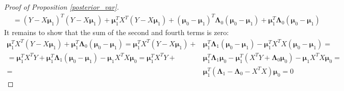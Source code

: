 \documentclass[10pt,fleqn]{amsart}
\theoremstyle{definition}
\theoremstyle{remark}
\numberwithin{equation}{section}
\newcommand{\mmu}{\boldsymbol{\mu}}
\newcommand{\LLambda}{\boldsymbol{\Lambda}}
\newcommand{\XTX}{X^TX}
\newcommand{\XTY}{X^TY}
\begin{document}
\begin{proof}[Proof of Proposition \ref{posterior_var}]
\begin{equation*}
\begin{split}
    &=\left(Y-X\mmu_1\right)^T\left(Y-X\mmu_1\right)+\mmu_1^TX^T\left(Y-X\mmu_1\right)+
    \left(\mmu_0-\mmu_1\right)^T\LLambda_0\left(\mmu_0-\mmu_1\right)+\mmu_1^T\LLambda_0\left(\mmu_0-\mmu_1\right)&&
\end{split}\end{equation*}
It remains to show that the sum of the second and fourth terms is zero:
\begin{equation*}\begin{split}
    \mmu_1^TX^T\left(Y-X\mmu_1\right)+\mmu_1^T\LLambda_0\left(\mmu_0-\mmu_1\right)=
    \mmu_1^TX^T\left(Y-X\mmu_1\right)+&\mmu_1^T\LLambda_1\left(\mmu_0-\mmu_1\right)-\mmu_1^T\XTX\left(\mmu_0-\mmu_1\right)=\\
    =\mmu_1^T\XTY+\mmu_1^T\LLambda_1\left(\mmu_0-\mmu_1\right)-\mmu_1\XTX\mmu_0=
    \mmu_1^T\XTY+&\mmu_1^T\LLambda_1\mmu_0-\mmu_1^T\left(\XTY+\LLambda_0\mmu_0\right)-\mmu_1\XTX\mmu_0=\\
    =&\mmu_1^T\left(\LLambda_1-\LLambda_0-\XTX\right)\mmu_0=0
\end{split}\end{equation*}
\end{proof}
\end{document}
